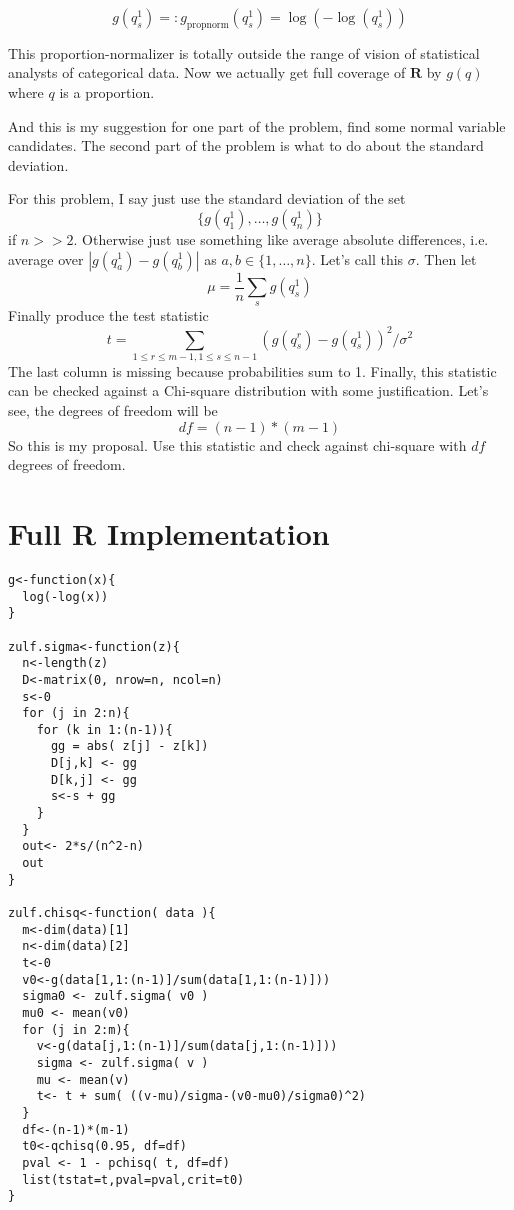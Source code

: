 \documentclass{amsart}
\begin{document}
\[
g(q^1_s) =: g_{\mathrm{propnorm}}( q^1_s ) = \log( -\log(q^1_s))
\]

This proportion-normalizer is totally outside the range of vision of statistical analysts of categorical data.  Now we actually get full coverage of $\mathbf{R}$ by $g(q)$ where $q$ is a proportion.  

And this is my suggestion for one part of the problem, find some normal variable candidates.  The second part of the problem is what to do about the standard deviation.

For this problem, I say just use the standard deviation of the set 
\[
\{ g(q^1_1),\dots, g(q^1_n) \}
\]
if $n >> 2$.  Otherwise just use something like average absolute differences, i.e. average over $|g(q^1_a) - g(q^1_b)|$ as $a,b \in \{1,\dots, n\}$.  Let's call this $\sigma$.  Then let 
\[
\mu = \frac{1}{n} \sum_s g(q^1_s)
\]
Finally produce the test statistic
\[
t = \sum_{1 \le r \le m-1,1 \le s \le n-1} (g(q^r_s)-g(q^1_s))^2/\sigma^2
\]
The last column is missing because probabilities sum to 1.
Finally, this statistic can be checked against a Chi-square distribution with some justification.  Let's see, the degrees of freedom will be 
\[
df = (n-1)*(m-1)
\]
So this is my proposal.  Use this statistic and check against chi-square with $df$ degrees of freedom.

\section{Full R Implementation}

\begin{verbatim}
g<-function(x){
  log(-log(x))
}

zulf.sigma<-function(z){
  n<-length(z)
  D<-matrix(0, nrow=n, ncol=n)
  s<-0
  for (j in 2:n){
    for (k in 1:(n-1)){
      gg = abs( z[j] - z[k])
      D[j,k] <- gg
      D[k,j] <- gg
      s<-s + gg
    }
  }
  out<- 2*s/(n^2-n)
  out
}

zulf.chisq<-function( data ){
  m<-dim(data)[1]
  n<-dim(data)[2]
  t<-0
  v0<-g(data[1,1:(n-1)]/sum(data[1,1:(n-1)]))
  sigma0 <- zulf.sigma( v0 )
  mu0 <- mean(v0)
  for (j in 2:m){
    v<-g(data[j,1:(n-1)]/sum(data[j,1:(n-1)]))
    sigma <- zulf.sigma( v )
    mu <- mean(v)
    t<- t + sum( ((v-mu)/sigma-(v0-mu0)/sigma0)^2)
  }
  df<-(n-1)*(m-1)
  t0<-qchisq(0.95, df=df)
  pval <- 1 - pchisq( t, df=df)
  list(tstat=t,pval=pval,crit=t0)
}
\end{verbatim}
\end{document}
